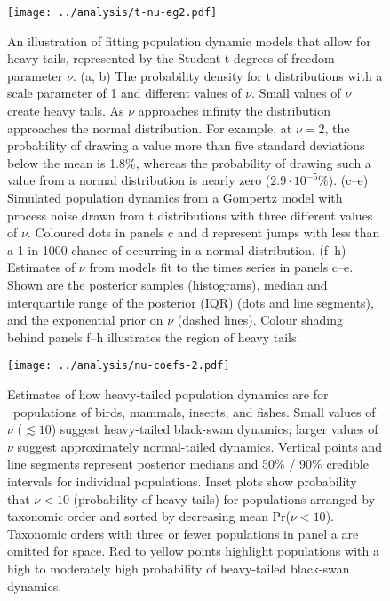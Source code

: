 \clearpage

\begin{figure}[htbp]
\begin{center}
\texttt{[image: ../analysis/t-nu-eg2.pdf]}
\caption{
An illustration of fitting population dynamic models that allow for heavy tails, represented by the Student-t degrees of freedom parameter $\nu$. (a, b) The probability density for t distributions with a scale parameter of 1 and different values of $\nu$. Small values of $\nu$ create heavy tails. As $\nu$ approaches infinity the distribution approaches the normal distribution. For example, at $\nu = 2$, the probability of drawing a value more than five standard deviations below the mean is 1.8\%, whereas the probability of drawing such a value from a normal distribution is nearly zero ($2.9\cdot10^{-5}$\%). (c--e) Simulated population dynamics from a Gompertz model with process noise drawn from t distributions with three different values of $\nu$. Coloured dots in panels c and d represent jumps with less than a 1 in 1000 chance of occurring in a normal distribution. (f--h) Estimates of $\nu$ from models fit to the times series in panels c--e. Shown are the posterior samples (histograms), median and interquartile range of the posterior (IQR) (dots and line segments), and the exponential prior on $\nu$ (dashed lines). Colour shading behind panels f--h illustrates the region of heavy tails.
}
\label{fig:didactic}
\end{center}
\end{figure}

\clearpage

\begin{figure}[htbp]
\begin{center}
\texttt{[image: ../analysis/nu-coefs-2.pdf]}
\caption{
Estimates of how heavy-tailed population dynamics are for \nuCoefPopN\ populations of birds, mammals, insects, and fishes. Small values of $\nu$ ($\lesssim 10$) suggest heavy-tailed black-swan dynamics; larger values of $\nu$ suggest approximately normal-tailed dynamics. Vertical points and line segments represent posterior medians and 50\% / 90\% credible intervals for individual populations. Inset plots show probability that $\nu < 10$ (probability of heavy tails) for populations arranged by taxonomic order and sorted by decreasing mean Pr($\nu < 10$). Taxonomic orders with three or fewer populations in panel a are omitted for space. Red to yellow points highlight populations with a high to moderately high probability of heavy-tailed black-swan dynamics.
}
\label{fig:nu-coefs}
\end{center}
\end{figure}
\clearpage

